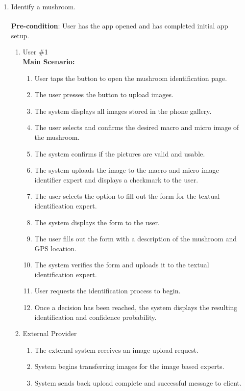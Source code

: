 \documentclass[]{article}
\begin{document}
\begin{enumerate}[{\bf BE1.}]
	\item Identify a mushroom. \\
	\\
	\textbf{Pre-condition}: User has the app opened and has completed initial app setup. 
		\begin{enumerate}[{\bf VP1.}]
			\item User \#1 \\
				\textbf{Main Scenario:}
				\begin{enumerate}[1.]
					\item User taps the button to open the mushroom identification page.
					\item The user presses the button to upload images.
					\item The system displays all images stored in the phone gallery.
					\item The user selects and confirms the desired macro and micro image of the mushroom.
					\item The system confirms if the pictures are valid and usable.
					\item The system uploads the image to the macro and micro image identifier expert and displays a checkmark to the user.
					\item The user selects the option to fill out the form for the textual identification expert. 
					\item The system displays the form to the user.
					\item The user fills out the form with a description of the mushroom and GPS location.
					\item The system verifies the form and uploads it to the textual identification expert.
					\item User requests the identification process to begin.
					\item Once a decision has been reached, the system displays the resulting identification and confidence probability.
				\end{enumerate}
			\item External Provider\\
				\begin{enumerate}[1.]
					\item The external system receives an image upload request.
					\item System begins transferring images for the image based experts.
					\item System sends back upload complete and successful message to client.

\end{enumerate}
\end{enumerate}
\end{enumerate}
\end{document}
